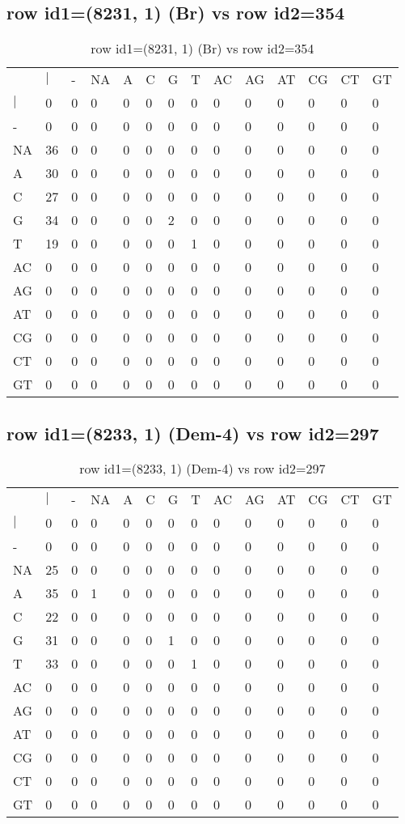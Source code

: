 \subsection{row id1=(8231, 1) (Br) vs row id2=354}
\begin{center}
\begin{longtable}{|l|l|l|l|l|l|l|l|l|l|l|l|l|l|}
\caption{row id1=(8231, 1) (Br) vs row id2=354} \label{table_dm354}\\
\hline
\\
\hline
&$|$&-&NA&A&C&G&T&AC&AG&AT&CG&CT&GT\\
$|$&0&0&0&0&0&0&0&0&0&0&0&0&0\\
-&0&0&0&0&0&0&0&0&0&0&0&0&0\\
NA&36&0&0&0&0&0&0&0&0&0&0&0&0\\
A&30&0&0&0&0&0&0&0&0&0&0&0&0\\
C&27&0&0&0&0&0&0&0&0&0&0&0&0\\
G&34&0&0&0&0&2&0&0&0&0&0&0&0\\
T&19&0&0&0&0&0&1&0&0&0&0&0&0\\
AC&0&0&0&0&0&0&0&0&0&0&0&0&0\\
AG&0&0&0&0&0&0&0&0&0&0&0&0&0\\
AT&0&0&0&0&0&0&0&0&0&0&0&0&0\\
CG&0&0&0&0&0&0&0&0&0&0&0&0&0\\
CT&0&0&0&0&0&0&0&0&0&0&0&0&0\\
GT&0&0&0&0&0&0&0&0&0&0&0&0&0\\
\hline
\end{longtable}
\end{center}

\subsection{row id1=(8233, 1) (Dem-4) vs row id2=297}
\begin{center}
\begin{longtable}{|l|l|l|l|l|l|l|l|l|l|l|l|l|l|}
\caption{row id1=(8233, 1) (Dem-4) vs row id2=297} \label{table_dm356}\\
\hline
\\
\hline
&$|$&-&NA&A&C&G&T&AC&AG&AT&CG&CT&GT\\
$|$&0&0&0&0&0&0&0&0&0&0&0&0&0\\
-&0&0&0&0&0&0&0&0&0&0&0&0&0\\
NA&25&0&0&0&0&0&0&0&0&0&0&0&0\\
A&35&0&1&0&0&0&0&0&0&0&0&0&0\\
C&22&0&0&0&0&0&0&0&0&0&0&0&0\\
G&31&0&0&0&0&1&0&0&0&0&0&0&0\\
T&33&0&0&0&0&0&1&0&0&0&0&0&0\\
AC&0&0&0&0&0&0&0&0&0&0&0&0&0\\
AG&0&0&0&0&0&0&0&0&0&0&0&0&0\\
AT&0&0&0&0&0&0&0&0&0&0&0&0&0\\
CG&0&0&0&0&0&0&0&0&0&0&0&0&0\\
CT&0&0&0&0&0&0&0&0&0&0&0&0&0\\
GT&0&0&0&0&0&0&0&0&0&0&0&0&0\\
\hline
\end{longtable}
\end{center}

